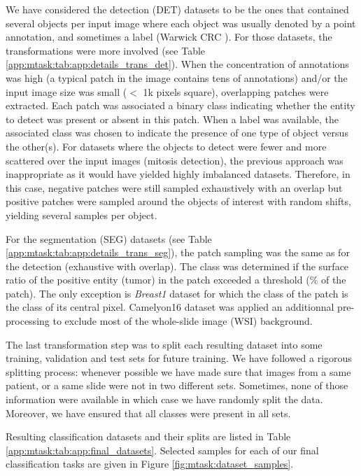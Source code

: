 We have considered the detection (DET) datasets to be the ones that contained several objects per input image where each object was usually denoted by a point annotation, and sometimes a label (\eg Warwick CRC \cite{sirinukunwattana2016locality}). For those datasets, the transformations were more involved (see Table \ref{app:mtask:tab:app:details_trans_det}). When the concentration of annotations was high (\ie a typical patch in the image contains tens of annotations) and/or the input image size was small (\ie $<$ 1k pixels square), overlapping patches were extracted. Each patch was associated a binary class indicating whether the entity to detect was present or absent in this patch. When a label was available, the associated class was chosen to indicate the presence of one type of object versus the other(s). For datasets where the objects to detect were fewer and more scattered over the input images (\eg mitosis detection), the previous approach was inappropriate as it would have yielded highly imbalanced datasets. Therefore, in this case, negative patches were still sampled exhaustively with an overlap but positive patches were sampled around the objects of interest with random shifts, yielding several samples per object. 

For the segmentation (SEG) datasets (see Table \ref{app:mtask:tab:app:details_trans_seg}), the patch sampling was the same as for the detection (\ie exhaustive with overlap). The class was determined if the surface ratio of the positive entity (\eg tumor) in the patch exceeded a threshold (\% of the patch). The only exception is \textit{Breast1} dataset for which the class of the patch is the class of its central pixel. Camelyon16 \cite{bejnordi2017diagnostic} dataset was applied an additionnal pre-processing to exclude most of the whole-slide image (WSI) background.

The last transformation step was to split each resulting dataset into some training, validation and test sets for future training. We have followed a rigorous splitting process: whenever possible we have made sure that images from a same patient, or a same slide were not in two different sets. Sometimes, none of those information were available in which case we have randomly split the data. Moreover, we have ensured that all classes were present in all sets.

Resulting classification datasets and their splits are listed in Table \ref{app:mtask:tab:app:final_datasets}. Selected samples for each of our final classification tasks are given in Figure \ref{fig:mtask:dataset_samples}.

